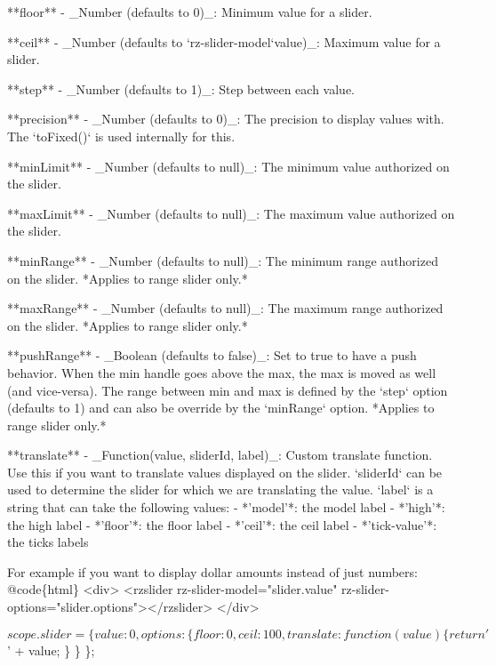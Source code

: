 \begin{DoxyCode}
**floor** - \_Number (defaults to 0)\_: Minimum value for a slider.

**ceil** - \_Number (defaults to `rz-slider-model`value)\_: Maximum value for a slider.

**step** - \_Number (defaults to 1)\_: Step between each value.

**precision** - \_Number (defaults to 0)\_: The precision to display values with. The `toFixed()` is used
       internally for this.

**minLimit** - \_Number (defaults to null)\_: The minimum value authorized on the slider.

**maxLimit** - \_Number (defaults to null)\_: The maximum value authorized on the slider.

**minRange** - \_Number (defaults to null)\_: The minimum range authorized on the slider. *Applies to range
       slider only.*

**maxRange** - \_Number (defaults to null)\_: The maximum range authorized on the slider. *Applies to range
       slider only.*

**pushRange** - \_Boolean (defaults to false)\_: Set to true to have a push behavior. When the min handle
       goes above the max, the max is moved as well (and vice-versa). The range between min and max is defined by the
       `step` option (defaults to 1) and can also be override by the `minRange` option. *Applies to range slider
       only.*

**translate** - \_Function(value, sliderId, label)\_: Custom translate function. Use this if you want to
       translate values displayed on the slider.
`sliderId` can be used to determine the slider for which we are translating the value. `label` is a string
       that can take the following values:
  - *'model'*: the model label
  - *'high'*: the high label
  - *'floor'*: the floor label
  - *'ceil'*: the ceil label
  - *'tick-value'*: the ticks labels

For example if you want to display dollar amounts instead of just numbers:
@code\{html\}
<div>
    <rzslider
         rz-slider-model="slider.value"
         rz-slider-options="slider.options"></rzslider>
</div>
\end{DoxyCode}
 
\begin{DoxyCode}
$scope.slider = \{
  value: 0,
  options: \{
    floor: 0,
    ceil: 100,
    translate: function(value) \{
      return '$' + value;
    \}
  \}
\};
\end{DoxyCode}


